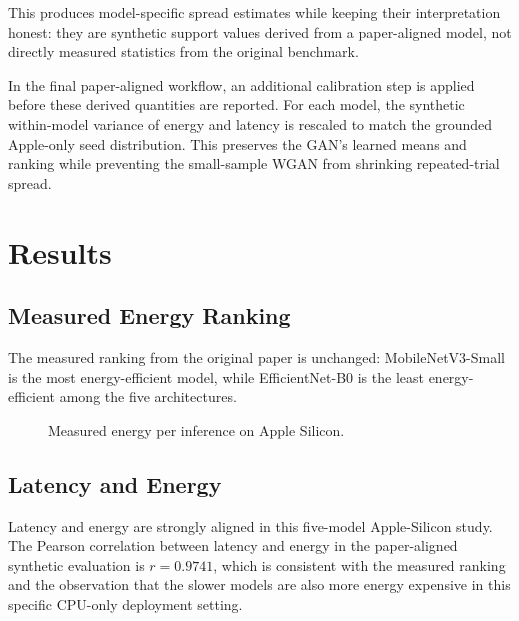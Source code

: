 \documentclass[11pt]{article}
\begin{document}
This produces model-specific spread estimates while keeping their interpretation
honest: they are synthetic support values derived from a paper-aligned model,
not directly measured statistics from the original benchmark.

In the final paper-aligned workflow, an additional calibration step is applied
before these derived quantities are reported. For each model, the synthetic
within-model variance of energy and latency is rescaled to match the grounded
Apple-only seed distribution. This preserves the GAN's learned means and ranking
while preventing the small-sample WGAN from shrinking repeated-trial spread.

\section{Results}
\subsection{Measured Energy Ranking}
The measured ranking from the original paper is unchanged:
MobileNetV3-Small is the most energy-efficient model, while
EfficientNet-B0 is the least energy-efficient among the five architectures.

\begin{figure}[ht]
\centering
{}
\caption{Measured energy per inference on Apple Silicon.}
\label{fig:measured-energy}
\end{figure}

\subsection{Latency and Energy}
Latency and energy are strongly aligned in this five-model Apple-Silicon study.
The Pearson correlation between latency and energy in the paper-aligned
synthetic evaluation is $r=0.9741$, which is consistent with the measured
ranking and the observation that the slower models are also more energy
expensive in this specific CPU-only deployment setting.
\end{document}
